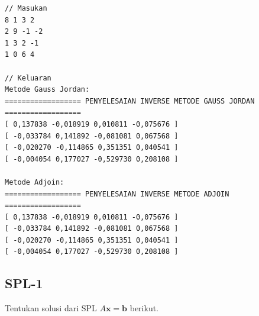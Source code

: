 \begin{lstlisting}[caption = Inverse]
// Masukan
8 1 3 2
2 9 -1 -2
1 3 2 -1
1 0 6 4

// Keluaran
Metode Gauss Jordan:
================== PENYELESAIAN INVERSE METODE GAUSS JORDAN ==================
[ 0,137838 -0,018919 0,010811 -0,075676 ]
[ -0,033784 0,141892 -0,081081 0,067568 ]
[ -0,020270 -0,114865 0,351351 0,040541 ]
[ -0,004054 0,177027 -0,529730 0,208108 ]

Metode Adjoin:
================== PENYELESAIAN INVERSE METODE ADJOIN ==================
[ 0,137838 -0,018919 0,010811 -0,075676 ]
[ -0,033784 0,141892 -0,081081 0,067568 ]
[ -0,020270 -0,114865 0,351351 0,040541 ]
[ -0,004054 0,177027 -0,529730 0,208108 ]
\end{lstlisting}
\pagebreak

\subsection{SPL-1}
Tentukan solusi dari SPL $A\textbf{x} = \textbf{b}$ berikut.

